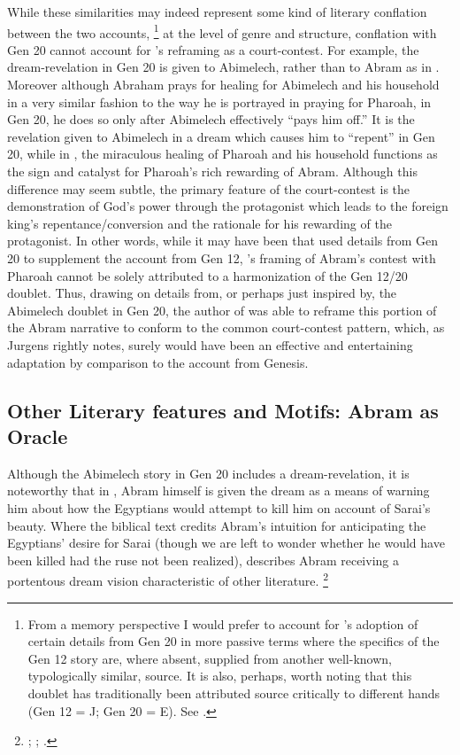 While these similarities may indeed represent some kind of literary conflation between the two accounts,%
    \footnote{From a memory perspective I would prefer to account for \ga's adoption of certain details from Gen 20 in more passive terms where the specifics of the Gen 12 story are, where absent, supplied from another well-known, typologically similar, source. It is also, perhaps, worth noting that this doublet has traditionally been attributed source critically to different hands (Gen 12 = J; Gen 20 = E). See \cite[15]{driver1956}.} 
at the level of genre and structure, conflation with Gen 20 cannot account for \ga's reframing as a court-contest. For example, the dream-revelation in Gen 20 is given to Abimelech, rather than to Abram as in \ga. Moreover although Abraham prays for healing for Abimelech and his household in a very similar fashion to the way he is portrayed in \ga praying for Pharoah, in Gen 20, he does so only after Abimelech effectively ``pays him off.'' It is the revelation given to Abimelech in a dream which causes him to ``repent'' in Gen 20, while in \ga, the miraculous healing of Pharoah and his household functions as the sign and catalyst for Pharoah's rich rewarding of Abram. Although this difference may seem subtle, the primary feature of the court-contest is the demonstration of God's power through the protagonist which leads to the foreign king's repentance/conversion and the rationale for his rewarding of the protagonist. In other words, while it may have been that \ga used details from Gen 20 to supplement the account from Gen 12, \ga's framing of Abram's contest with Pharoah cannot be solely attributed to a harmonization of the Gen 12/20 doublet. Thus, drawing on details from, or perhaps just inspired by, the Abimelech doublet in Gen 20, the author of \ga was able to reframe this portion of the Abram narrative to conform to the common court-contest pattern, which, as Jurgens rightly notes, surely would have been an effective and entertaining adaptation by comparison to the account from Genesis.

\subsection{Other Literary features and Motifs: Abram as Oracle}
Although the Abimelech story in Gen 20 includes a dream-revelation, it is noteworthy that in \ga, Abram himself is given the dream as a means of warning him about how the Egyptians would attempt to kill him on account of Sarai's beauty. Where the biblical text credits Abram's intuition for anticipating the Egyptians' desire for Sarai (though we are left to wonder whether he would have been killed had the ruse not been realized), \ga describes Abram receiving a portentous dream vision characteristic of other \secondtemple literature.%
    \footnote{\Cite{gevirtz_maarav1992}; \cite[184]{fitzmyer2004}; \cite{dacy_tzoref2013}.}

